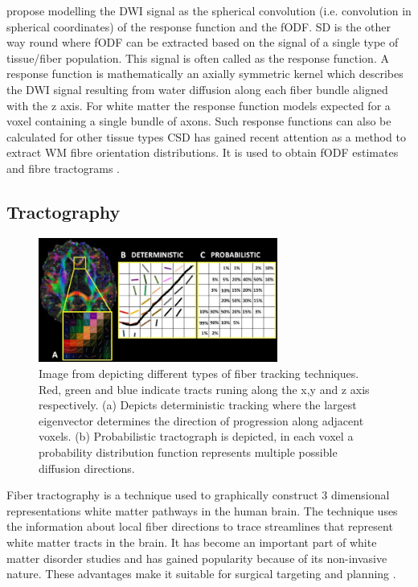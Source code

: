 \documentclass[msthesis.tex]{subfiles}
\begin{document}
 \cite{tournier2004direct} propose modelling the DWI signal as the spherical convolution (i.e. convolution in spherical coordinates) of the response function and the \gls{fODF}. \gls{SD} is the other way round where \gls{fODF} can be extracted based on the signal of a single type of tissue/fiber population. This signal is often called as the response function. A response function is mathematically an axially symmetric kernel which describes the \gls{DWI} signal resulting from water diffusion along each fiber bundle aligned with the z axis. For white matter the response function models expected for a voxel containing a single bundle of axons. Such response functions can also be calculated for other tissue types
\gls{CSD} has gained recent attention as a method to extract \gls{WM} fibre orientation distributions. It is used to obtain \gls{fODF} estimates and fibre tractograms \cite{JEURISSEN2014411}.

\subsection{Tractography}
\label{subsub:tractography}
\begin{figure}
    \centering
    \includegraphics[width=0.7\textwidth]{images/A-Degree-of-anisotropy-B-Deterministic-fiber-tracking-the-fiber-path-across-voxels-is.png}
    \caption{Image from \cite{muller2018clinically} depicting different types of fiber tracking techniques. Red, green and blue indicate tracts runing along the x,y and z axis respectively. (a) Depicts deterministic tracking where the largest eigenvector determines the direction of progression along adjacent voxels. (b) Probabilistic tractograph is depicted, in each voxel a probability distribution function represents multiple possible diffusion directions.}
    \label{fig:tracking}
\end{figure}
Fiber tractography is a technique used to graphically construct  3 dimensional representations white matter pathways in the human brain. The technique uses the information about local fiber directions to trace streamlines that represent white matter tracts in the brain. It has become an important part of white matter disorder studies and has gained popularity because of its non-invasive nature. These advantages make it suitable for surgical targeting and planning \citep{romano2009pre}.
\end{document}
